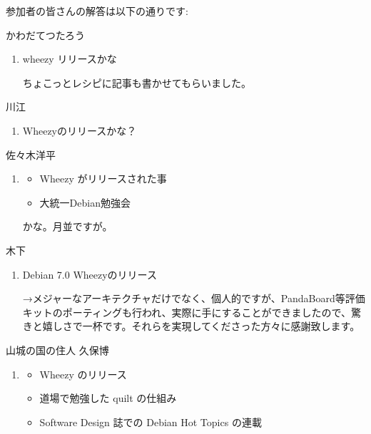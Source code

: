 \documentclass[mingoth,a4paper]{jsarticle}
\begin{document}
参加者の皆さんの解答は以下の通りです:

\begin{prework}{ かわだてつたろう }
  \begin{enumerate}
  \item wheezy リリースかな

    ちょこっとレシピに記事も書かせてもらいました。
  \end{enumerate}
\end{prework}

\begin{prework}{ 川江 }
  \begin{enumerate}
  \item Wheezyのリリースかな？
  \end{enumerate}
\end{prework}

\begin{prework}{ 佐々木洋平 }
  \begin{enumerate}
  \item
    \begin{itemize}
    \item Wheezy がリリースされた事
    \item 大統一Debian勉強会
    \end{itemize}

    かな。月並ですが。
  \end{enumerate}
\end{prework}

\begin{prework}{ 木下 }
  \begin{enumerate}
  \item Debian 7.0 Wheezyのリリース

    →メジャーなアーキテクチャだけでなく、個人的ですが、PandaBoard等評価キットのポーティングも行われ、実際に手にすることができましたので、驚きと嬉しさで一杯です。それらを実現してくださった方々に感謝致します。
  \end{enumerate}
\end{prework}

\begin{prework}{ 山城の国の住人 久保博 }
  \begin{enumerate}
  \item
    \begin{itemize}
    \item Wheezy のリリース
    \item 道場で勉強した quilt の仕組み
    \item Software Design 誌での Debian Hot Topics の連載
    \end{itemize}
  \end{enumerate}
\end{prework}
\end{document}
